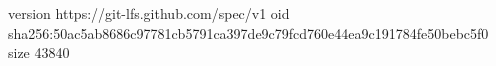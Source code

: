 version https://git-lfs.github.com/spec/v1
oid sha256:50ac5ab8686c97781cb5791ca397de9c79fcd760e44ea9c191784fe50bebc5f0
size 43840
